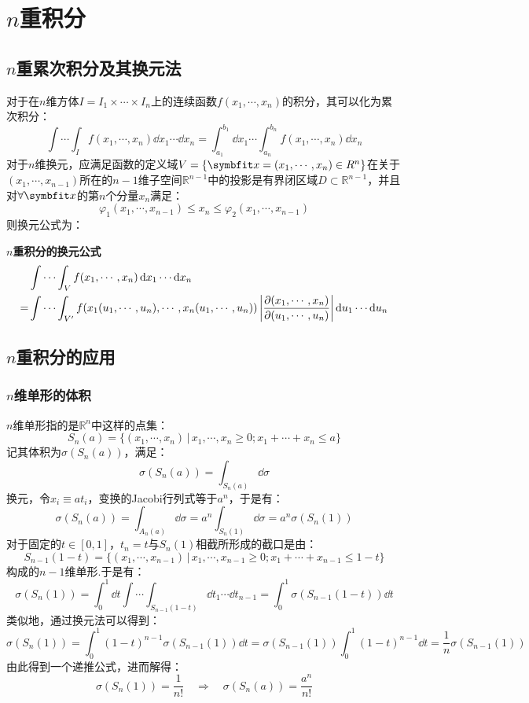 \section{\texorpdfstring{$n$重积分}{n重积分}}
\subsection{\texorpdfstring{$n$重累次积分及其换元法}{n重累次积分及其换元法}}
对于在$n$维方体$I = I_1 \times \cdots \times I_n$上的连续函数$f(x_1,\cdots,x_n)$的积分，其可以化为累次积分：
\[\int\cdots\int_I f(x_1,\cdots,x_n)\dd{x_1}\cdots\dd{x_n} = \int_{a_1}^{b_1}\dd{x_1}\cdots\int_{a_n}^{b_n}f(x_1,\cdots,x_n)\dd{x_n}\]
对于$n$维换元，应满足函数的定义域$V=\{\vb{x}=(x_1,\cdots,x_n)\in\mathbb{R}^n\}$在关于$(x_1,\cdots,x_{n-1})$所在的$n-1$维子空间$\mathbb{R}^{n-1}$中的投影是有界闭区域$D \subset \mathbb{R}^{n-1}$，并且对$\forall\vb{x}$的第$n$个分量$x_n$满足：
\[\varphi_1(x_1,\cdots,x_{n-1}) \leqslant x_n \leqslant \varphi_2(x_1,\cdots,x_{n-1})\]
则换元公式为：
\begin{theorem}
    \textbf{$n$重积分的换元公式}
    \begin{align*}
        &\int\cdots\int_V f(x_1,\cdots,x_n)\dd{x_1}\cdots\dd{x_n} \\
        =& \int\cdots\int_{V'}f(x_1(u_1,\cdots,u_n),\cdots,x_n(u_1,\cdots,u_n))\left|\pdv{(x_1,\cdots,x_n)}{(u_1,\cdots,u_n)}\right|\dd{u_1}\cdots\dd{u_n}
    \end{align*}
\end{theorem}


\subsection{\texorpdfstring{$n$重积分的应用}{n重积分的应用}}
\subsubsection{\texorpdfstring{$n$维单形的体积}{n维单形的体积}}
$n$维单形指的是$\mathbb{R}^n$中这样的点集：
\[S_n(a) = \{(x_1,\cdots,x_n)\,|\,x_1,\cdots,x_n \geqslant 0;x_1+\cdots+x_n \leqslant a\}\]
记其体积为$\sigma(S_n(a))$，满足：
\[\sigma(S_n(a)) = \int_{S_n(a)}\dd{\sigma}\]
换元，令$x_i \equiv at_i$，变换的Jacobi行列式等于$a^n$，于是有：
\[\sigma(S_n(a)) = \int_{A_n(a)}\dd{\sigma} = a^n \int_{S_n(1)}\dd{\sigma} = a^n \sigma(S_n(1))\]
对于固定的$t\in[0,1]$，$t_n = t$与$S_n(1)$相截所形成的截口是由：
\[S_{n-1}(1-t) = \{(x_1,\cdots,x_{n-1})\,|\,x_1,\cdots,x_{n-1}\geqslant 0; x_1+\cdots+x_{n-1}\leqslant 1-t\}\]
构成的$n-1$维单形.于是有：
\[\sigma(S_n(1)) = \int_{0}^{1}\dd{t}\int\cdots\int_{S_{n-1}(1-t)}\dd{t_1}\cdots\dd{t_{n-1}} = \int_{0}^{1}\sigma(S_{n-1}(1-t))\dd{t}\]
类似地，通过换元法可以得到：
\[\sigma(S_n(1)) = \int_{0}^{1}(1-t)^{n-1}\sigma(S_{n-1}(1))\dd{t} = \sigma(S_{n-1}(1))\int_{0}^{1}(1-t)^{n-1}\dd{t} = \frac{1}{n}\sigma(S_{n-1}(1))\]
由此得到一个递推公式，进而解得：
\[\sigma(S_n(1)) = \frac{1}{n!} \quad\Rightarrow\quad \sigma(S_n(a)) = \frac{a^n}{n!}\]


